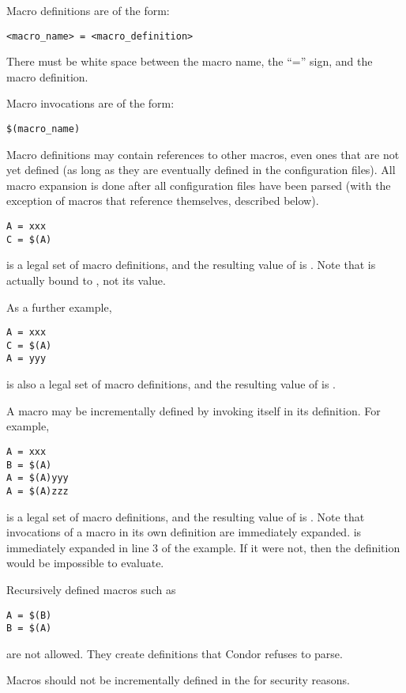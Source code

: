 
Macro definitions are of the form:
\begin{verbatim}
<macro_name> = <macro_definition>
\end{verbatim}

\Note There must be white space between the macro name, the
``='' sign, and the macro definition.

Macro invocations are of the form: 
\begin{verbatim}
$(macro_name)
\end{verbatim}

Macro definitions may contain references to other macros, even ones
that are not yet defined (as long as they are eventually defined in
the configuration files).
All macro expansion is done after all configuration files have been parsed
(with the exception of macros that reference themselves, described
below). 

\begin{verbatim}
A = xxx
C = $(A) 
\end{verbatim}
is a legal set of macro definitions, and the resulting value of 
 is
.
Note that
 is actually bound to 
, not its value.

As a further example,
\begin{verbatim}
A = xxx
C = $(A)
A = yyy
\end{verbatim}
is also a legal set of macro definitions, and the resulting value of
 is .  

A macro may be incrementally defined by invoking itself in its
definition.  For example,
\begin{verbatim}
A = xxx
B = $(A)
A = $(A)yyy
A = $(A)zzz
\end{verbatim}
is a legal set of macro definitions, and the resulting value of 
is .
Note that invocations of a macro in
its own definition are immediately
expanded.
 is immediately expanded in line 3 of the example.
If it were not, then the definition would be impossible to
evaluate.

Recursively defined macros such as
\begin{verbatim}
A = $(B)
B = $(A)
\end{verbatim}
are not allowed.
They create definitions that Condor refuses to parse. 

\Note Macros should not be incrementally defined in the
 for security reasons.

